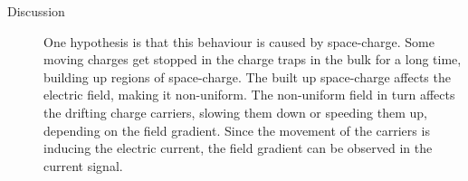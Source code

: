 \begin{description}
\item[Discussion] One hypothesis is that this behaviour is caused by space-charge. Some moving charges get stopped in the charge traps in the bulk for a long time, building up regions of space-charge. The built up space-charge affects the electric field, making it non-uniform. The non-uniform field in turn affects the drifting charge carriers, slowing them down or speeding them up, depending on the field gradient. Since the movement of the carriers is inducing the electric current, the field gradient can be observed in the current signal. 
\end{description}







